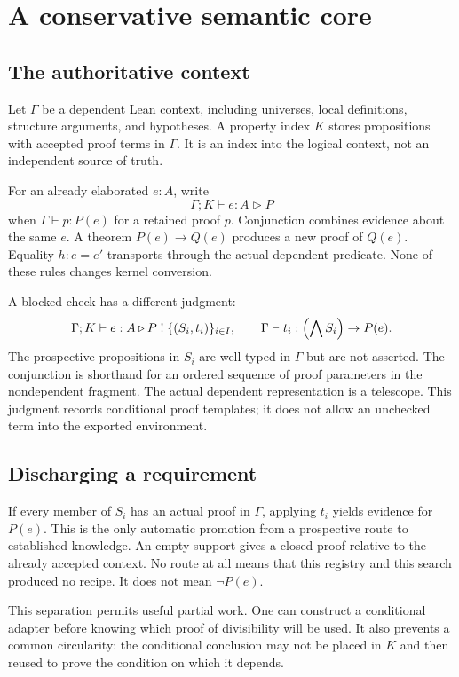 \documentclass[11pt,a4paper]{article}
\theoremstyle{definition}\newtheorem{definition}[theorem]{Definition}
\theoremstyle{remark}\newtheorem{remark}[theorem]{Remark}
\begin{document}
\section{A conservative semantic core}\label{sec:semantics}

\subsection{The authoritative context}
Let $\Gamma$ be a dependent Lean context, including universes, local definitions, structure arguments, and hypotheses. A property index $K$ stores propositions with accepted proof terms in $\Gamma$. It is an index into the logical context, not an independent source of truth.

For an already elaborated $e:A$, write
\[
 \Gamma;K\vdash e:A\triangleright P
\]
when $\Gamma\vdash p:P(e)$ for a retained proof $p$. Conjunction combines evidence about the same $e$. A theorem $P(e)\to Q(e)$ produces a new proof of $Q(e)$. Equality $h:e=e'$ transports through the actual dependent predicate. None of these rules changes kernel conversion.

A blocked check has a different judgment:
\begin{equation}\label{eq:conditional}
 \Gamma;K\vdash e:A\triangleright P\;!\;\{(S_i,t_i)\}_{i\in I},
 \qquad
 \Gamma\vdash t_i:\Bigl(\bigwedge S_i\Bigr)\to P(e).
\end{equation}
The prospective propositions in $S_i$ are well-typed in $\Gamma$ but are not asserted. The conjunction is shorthand for an ordered sequence of proof parameters in the nondependent fragment. The actual dependent representation is a telescope. This judgment records conditional proof templates; it does not allow an unchecked term into the exported environment.

\subsection{Discharging a requirement}
If every member of $S_i$ has an actual proof in $\Gamma$, applying $t_i$ yields evidence for $P(e)$. This is the only automatic promotion from a prospective route to established knowledge. An empty support gives a closed proof relative to the already accepted context. No route at all means that this registry and this search produced no recipe. It does not mean $\neg P(e)$.

This separation permits useful partial work. One can construct a conditional adapter before knowing which proof of divisibility will be used. It also prevents a common circularity: the conditional conclusion may not be placed in $K$ and then reused to prove the condition on which it depends.
\end{document}
